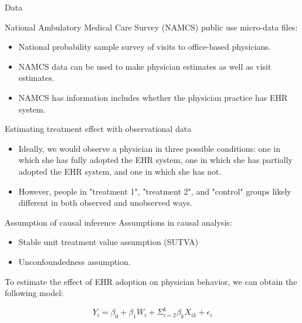 \documentclass[10pt, compress]{beamer}
\begin{document}
\begin{frame}{Data}

National Ambulatory Medical Care Survey (NAMCS) public use micro-data files:   
      \begin{itemize}
        \item  National probability sample survey of visits to office-based physicians. 
        \item NAMCS data can be used to make physician estimates as well as visit estimates.
        \item NAMCS has information includes whether the physician practice has EHR system.
      \end{itemize}

\end{frame}

\begin{frame}{Estimating treatment effect with observational data}
   
      \begin{itemize}
        \item  Ideally, we would observe a physician in three possible conditions: one in which she has fully adopted the EHR system, one in which she has partially adopted the EHR system, and one in which she has not. 
        \item However, people in "treatment 1", "treatment 2", and "control" groups likely different in both observed and unobserved ways.
      \end{itemize}

\end{frame}

\begin{frame}{Assumption of causal inference}
   Assumptions in causal analysis:
      \begin{itemize}
        \item  Stable unit treatment value assumption (SUTVA)
        \item  Unconfoundedness assumption.
      \end{itemize}
	To estimate the effect of EHR adoption on physician behavior, we can obtain the following model:

\begin{equation*}
Y_{i} = \beta_0 + \beta_1 W_i + \Sigma^k_{i=2} \beta_k X_{ik} + \epsilon_{i}
\end{equation*}

\end{frame}
\end{document}
